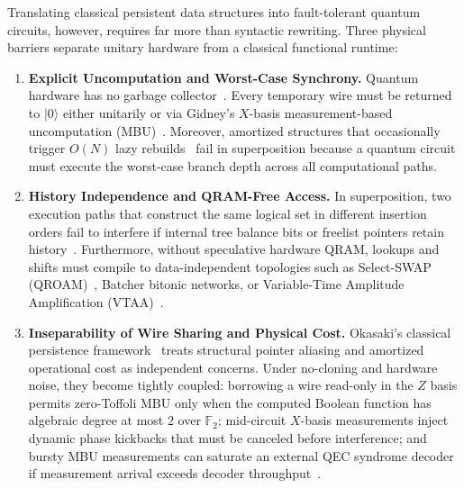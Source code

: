 \documentclass[acmsmall,screen,anonymous]{acmart}
\DeclareRobustCommand{\_}{\ifmmode\text{\char95}\else\char95\penalty0\relax\fi}
\theoremstyle{plain}
\begin{document}
Translating classical persistent data structures into fault-tolerant quantum circuits, however, requires far more than syntactic rewriting. Three physical barriers separate unitary hardware from a classical functional runtime:
\begin{enumerate}
  \item \textbf{Explicit Uncomputation and Worst-Case Synchrony.} Quantum hardware has no garbage collector~\cite{bennett1989,bichsel2020,paradis2021}. Every temporary wire must be returned to $|0\rangle$ either unitarily or via Gidney's $X$-basis measurement-based uncomputation (MBU)~\cite{gidney2018}. Moreover, amortized structures that occasionally trigger $O(N)$ lazy rebuilds~\cite{hood1981} fail in superposition because a quantum circuit must execute the worst-case branch depth across all computational paths.
  \item \textbf{History Independence and QRAM-Free Access.} In superposition, two execution paths that construct the same logical set in different insertion orders fail to interfere if internal tree balance bits or freelist pointers retain history~\cite{bernstein2009,yuan2022tower}. Furthermore, without speculative hardware QRAM, lookups and shifts must compile to data-independent topologies such as Select-SWAP (QROAM)~\cite{low2018,babbush2018}, Batcher bitonic networks, or Variable-Time Amplitude Amplification (VTAA)~\cite{ambainis2010}.
  \item \textbf{Inseparability of Wire Sharing and Physical Cost.} Okasaki's classical persistence framework~\cite{okasaki1998} treats structural pointer aliasing and amortized operational cost as independent concerns. Under no-cloning and hardware noise, they become tightly coupled: borrowing a wire read-only in the $Z$ basis permits zero-Toffoli MBU only when the computed Boolean function has algebraic degree at most $2$ over $\mathbb{F}_2$; mid-circuit $X$-basis measurements inject dynamic phase kickbacks that must be canceled before interference; and bursty MBU measurements can saturate an external QEC syndrome decoder if measurement arrival exceeds decoder throughput~\cite{terhal2015}.
\end{enumerate}
\end{document}
